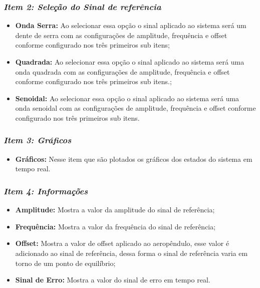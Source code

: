 \subsubsection*{\textit{Item 2: Seleção do Sinal de referência}}


\begin{itemize}
        \setlength{\itemsep}{-2pt}
	\item \textbf{Onda Serra:} Ao selecionar essa opção o sinal aplicado ao sistema será um dente de serra com as configurações de amplitude, frequência e offset conforme configurado nos três primeiros sub itens;
        \item \textbf{Quadrada:} Ao selecionar essa opção o sinal aplicado ao sistema será uma onda quadrada com as configurações de amplitude, frequência e offset conforme configurado nos três primeiros sub itens.;
        \item \textbf{Senoidal:} Ao selecionar essa opção o sinal aplicado ao sistema será uma onda senoidal com as configurações de amplitude, frequência e offset conforme configurado nos três primeiros sub itens.
\end{itemize}

\subsubsection*{\textit{Item 3: Gráficos}}

\begin{itemize}
        \setlength{\itemsep}{-2pt}
	\item \textbf{Gráficos:} Nesse item que são plotados os gráficos dos estados do sistema em tempo real.
\end{itemize}

\subsubsection*{\textit{Item 4: Informações}}

\begin{itemize}
        \setlength{\itemsep}{-2pt}
	\item \textbf{Amplitude:} Mostra a valor da amplitude do sinal de referência;
        \item \textbf{Frequência:} Mostra a valor da frequência do sinal de referência;\\
        \item \textbf{Offset:} Mostra a valor de offset aplicado ao aeropêndulo, esse valor é adicionado ao sinal de referência, dessa forma o sinal de referência varia em torno de um ponto de equilíbrio;
        \item \textbf{Sinal de Erro:} Mostra a valor do sinal de erro em tempo real.
\end{itemize}


